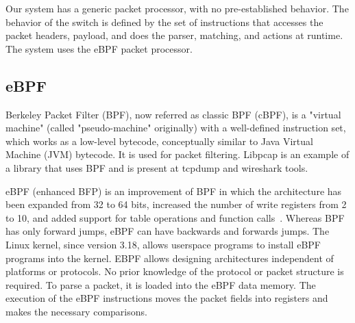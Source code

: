 Our system has a generic packet processor, with no pre-established behavior.
The behavior of the switch is defined by the set of instructions that accesses the packet headers, payload, and does the parser, matching, and actions at runtime.
The system uses the eBPF packet processor.

\subsection{eBPF}

Berkeley Packet Filter (BPF)\cite{McCanne:1993:BPF:1267303.1267305}, now referred as classic BPF (cBPF), is a "virtual machine" (called "pseudo-machine" originally) with a well-defined instruction set, which works as a low-level bytecode, conceptually similar to Java Virtual Machine (JVM) bytecode. It is used for packet filtering. Libpcap is an example of a library that uses BPF and is present at tcpdump and wireshark tools.



eBPF (enhanced BFP) is an improvement of BPF in which the architecture has been expanded from 32 to 64 bits, increased the number of write registers from 2 to 10, and added support for table operations and function calls~\cite{eBPF}.
Whereas BPF has only forward jumps, eBPF can have backwards and forwards jumps.
The Linux kernel, since version 3.18, allows userspace programs to install eBPF programs into the kernel. 
EBPF allows designing architectures independent of platforms or protocols.
No prior knowledge of the protocol or packet structure is required. 
To parse a packet, it is loaded into the eBPF data memory. The execution of the eBPF instructions moves the packet fields into registers and makes the necessary comparisons.

